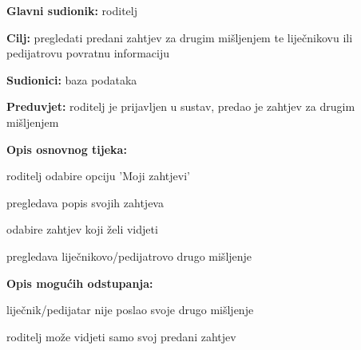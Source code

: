                     \noindent {}
					\begin{packed_item}
	
						\item \textbf{Glavni sudionik: }roditelj
						\item  \textbf{Cilj:} pregledati predani zahtjev za drugim mišljenjem te liječnikovu ili pedijatrovu povratnu informaciju 
						\item  \textbf{Sudionici:} baza podataka
						\item  \textbf{Preduvjet:} roditelj je prijavljen u sustav, predao je zahtjev za drugim mišljenjem
						\item  \textbf{Opis osnovnog tijeka:}
						
						\item[] \begin{packed_enum}
	
							\item roditelj odabire opciju 'Moji zahtjevi'
							\item pregledava popis svojih zahtjeva
							\item odabire zahtjev koji želi vidjeti
                            \item pregledava liječnikovo/pedijatrovo drugo mišljenje

						\end{packed_enum}
						
						\item  \textbf{Opis mogućih odstupanja:}
						
						\item[] \begin{packed_item}
	
							\item[3.a] liječnik/pedijatar nije poslao svoje drugo mišljenje
							\item[] \begin{packed_enum}
								\item roditelj može vidjeti samo svoj predani zahtjev
							\end{packed_enum}
							
						\end{packed_item}
					\end{packed_item}

